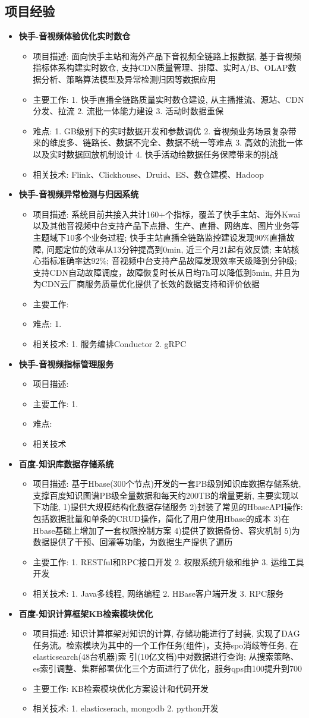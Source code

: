 \documentclass[letterpaper,11pt]{article}
\newcommand{\resumeItem}[2]{
  \item\small{
    \textbf{#1}{#2 \vspace{-2pt}}
  }
}
\newcommand{\resumeSubItem}[2]{\resumeItem{#1}{#2}\vspace{-4pt}}
\newcommand{\resumeSubHeadingListStart}{\begin{itemize}[leftmargin=*]}
\newcommand{\resumeSubHeadingListEnd}{\end{itemize}}
\newcommand{\resumeItemListStart}{\begin{itemize}}
\newcommand{\resumeItemListEnd}{\end{itemize}\vspace{-5pt}}
\begin{document}
\begin{CJK}{UTF8}{gkai}
\section{项目经验}
  \resumeSubHeadingListStart
    \resumeSubItem{快手-音视频体验优化实时数仓}{}
    \resumeItemListStart
        \resumeItem{}
          {项目描述: 面向快手主站和海外产品下音视频全链路上报数据, 基于音视频指标体系构建实时数仓, 支持CDN质量管理、排障、实时A/B、OLAP数据分析、策略算法模型及异常检测归因等数据应用}
        \resumeItem{}
          {主要工作: 1. 快手直播全链路质量实时数仓建设, 从主播推流、源站、CDN分发、拉流 2. 流批一体能力建设 3. 活动时数据重保}
        \resumeItem{}
          {难点: 1. GB级别下的实时数据开发和参数调优 2. 音视频业务场景复杂带来的维度多、链路长、数据不完全、数据不统一等难点 3. 高效的流批一体以及实时数据回放机制设计 4. 快手活动给数据任务保障带来的挑战}
        \resumeItem{}
          {相关技术: Flink、Clickhouse、Druid、ES、数仓建模、Hadoop}
    \resumeItemListEnd
    \resumeSubItem{快手-音视频异常检测与归因系统}{}
    \resumeItemListStart
    \resumeItem{}
      {项目描述: 系统目前共接入共计160+个指标，覆盖了快手主站、海外Kwai以及其他音视频中台支持产品下点播、生产、直播、网络库、图片业务等主题域下10多个业务过程; 快手主站直播全链路监控建设发现90\%直播故障, 问题定位的效率从13分钟提高到0min, 近三个月21起有效反馈; 主站核心指标准确率达92\%; 音视频中台支持产品故障发现效率天级降到分钟级; 支持CDN自动故障调度，故障恢复时长从日均7h可以降低到5min, 并且为为CDN云厂商服务质量优化提供了长效的数据支持和评价依据}
    \resumeItem{}
      {主要工作: }
    \resumeItem{}
      {难点: 1. }
    \resumeItem{}
      {相关技术: 1. 服务编排Conductor 2. gRPC}
    \resumeItemListEnd
    \resumeSubItem{快手-音视频指标管理服务}{}
    \resumeItemListStart
    \resumeItem{}
      {项目描述: }
    \resumeItem{}
      {主要工作: 1. }
    \resumeItem{}
      {难点:}
    \resumeItem{}
      {相关技术}
    \resumeItemListEnd
    \resumeSubItem{百度-知识库数据存储系统}{}
    \resumeItemListStart
    \resumeItem{}
      {项目描述: 基于Hbase(300个节点)开发的一套PB级别知识库数据存储系统, 支撑百度知识图谱PB级全量数据和每天约200TB的增量更新, 主要实现以下功能, 1)提供大规模结构化数据存储服务 2)封装了常见的HbaseAPI操作: 包括数据批量和单条的CRUD操作，简化了用户使用Hbase的成本 3)在Hbase基础上增加了一套权限控制方案 4)提供了数据备份、容灾机制 5)为数据提供了干预、回灌等功能，为数据生产提供了遍历}
    \resumeItem{}
      {主要工作: 1. RESTful和RPC接口开发 2. 权限系统升级和维护 3. 运维工具开发} 
    \resumeItem{}
      {相关技术: 1. Java多线程, 网络编程 2. HBase客户端开发 3. RPC服务}
    \resumeItemListEnd
    \resumeSubItem{百度-知识计算框架KB检索模块优化}{}
    \resumeItemListStart
    \resumeItem{}
      {项目描述: 知识计算框架对知识的计算, 存储功能进行了封装, 实现了DAG任务流。检索模块为其中的一个工作任务(组件)，支持spo消歧等任务, 在elasticsearch(48台机器)索 引(10亿文档)中对数据进行查询; 从搜索策略、es索引调整、集群部署优化三个方面进行了优化，服务qps由100提升到700}
    \resumeItem{}
      {主要工作: KB检索模块优化方案设计和代码开发} 
    \resumeItem{}
      {相关技术:  1. elasticserach, mongodb 2. python开发}
    \resumeItemListEnd
  \resumeSubHeadingListEnd


\end{CJK}
\end{document}
